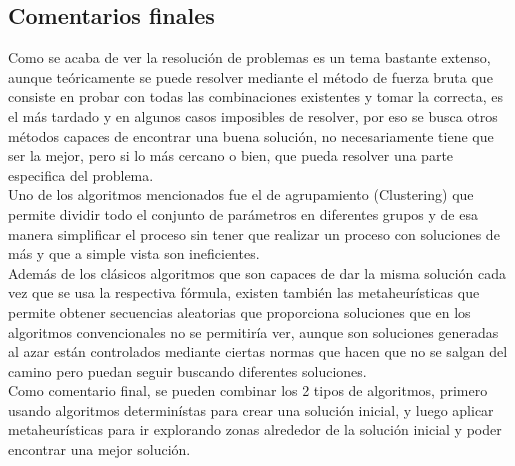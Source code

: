 \subsection {Comentarios finales}
Como se acaba de ver la resolución de problemas es un tema bastante extenso, aunque teóricamente se puede resolver mediante el método de fuerza bruta que consiste en probar con todas las combinaciones existentes y tomar la correcta, es el más tardado y en algunos casos imposibles de resolver, por eso se busca otros métodos capaces de encontrar una buena solución, no necesariamente tiene que ser la mejor, pero si lo más cercano o bien, que pueda resolver una parte especifica del problema.\\
\hspace*{1cm}Uno de los algoritmos mencionados fue el de agrupamiento (Clustering) que permite dividir todo el conjunto de parámetros en diferentes grupos y de esa manera simplificar el proceso sin tener que realizar un proceso con soluciones de más y que a simple vista son ineficientes.\\
\hspace*{1cm}Además de los clásicos algoritmos que son capaces de dar la misma solución cada vez que se usa la respectiva fórmula, existen también las metaheurísticas que permite obtener secuencias aleatorias que proporciona soluciones que en los algoritmos convencionales no se permitiría ver, aunque son soluciones generadas al azar están controlados mediante ciertas normas que hacen que no se salgan del camino pero puedan seguir buscando diferentes soluciones.\\
\hspace*{1cm}Como comentario final, se pueden combinar los 2 tipos de algoritmos, primero usando algoritmos determinístas para crear una solución inicial, y luego aplicar metaheurísticas para ir explorando zonas alrededor de la solución inicial y poder encontrar una mejor solución.\\ 